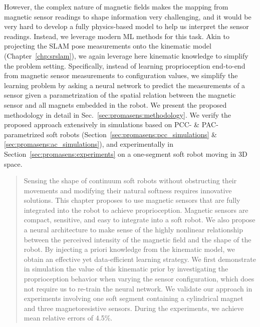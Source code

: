\begin{foreword}
    However, the complex nature of magnetic fields makes the mapping from magnetic sensor readings to shape information very challenging, and it would be very hard to develop a fully physics-based model to help us interpret the sensor readings. Instead, we leverage modern \gls{ML} methods for this task.
    Akin to projecting the \gls{SLAM} pose measurements onto the kinematic model (Chapter~\ref{chp:srslam}), we again leverage here kinematic knowledge to simplify the problem setting. 
    Specifically, instead of learning proprioception end-to-end from magnetic sensor measurements to configuration values, we simplify the learning problem by asking a neural network to predict the measurements of a sensor given a parametrization of the spatial relation between the magnetic sensor and all magnets embedded in the robot. We present the proposed methodology in detail in Sec.~\ref{sec:promasens:methodology}.
    We verify the proposed approach extensively in simulations based on \gls{PCC}- \& \gls{PAC}-parametrized soft robots (Section~\ref{sec:promasens:pcc_simulations} \& \ref{sec:promasens:ac_simulations}), and experimentally in Section~\ref{sec:promasens:experiments} on a one-segment soft robot moving in 3D space.
\end{foreword}


\pagebreak

\begin{abstract}
    Sensing the shape of continuum soft robots without obstructing their movements and modifying their natural softness requires innovative solutions. This chapter proposes to use magnetic sensors that are fully integrated into the robot to achieve proprioception. Magnetic sensors are compact, sensitive, and easy to integrate into a soft robot. We also propose a neural architecture to make sense of the highly nonlinear relationship between the perceived intensity of the magnetic field and the shape of the robot. By injecting a priori knowledge from the kinematic model, we obtain an effective yet data-efficient learning strategy. We first demonstrate in simulation the value of this kinematic prior by investigating the proprioception behavior when varying the sensor configuration, which does not require us to re-train the neural network. We validate our approach in experiments involving one soft segment containing a cylindrical magnet and three magnetoresistive sensors. During the experiments, we achieve mean relative errors of 4.5\%.
\end{abstract}

